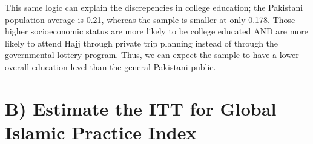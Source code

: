 \documentclass[
]{article}
\newenvironment{Shaded}{\begin{snugshade}}{\end{snugshade}}
\newcommand{\AttributeTok}[1]{\textcolor[rgb]{0.77,0.63,0.00}{#1}}
\newcommand{\CommentTok}[1]{\textcolor[rgb]{0.56,0.35,0.01}{\textit{#1}}}
\newcommand{\ControlFlowTok}[1]{\textcolor[rgb]{0.13,0.29,0.53}{\textbf{#1}}}
\newcommand{\DecValTok}[1]{\textcolor[rgb]{0.00,0.00,0.81}{#1}}
\newcommand{\FunctionTok}[1]{\textcolor[rgb]{0.00,0.00,0.00}{#1}}
\newcommand{\NormalTok}[1]{#1}
\newcommand{\OtherTok}[1]{\textcolor[rgb]{0.56,0.35,0.01}{#1}}
\newcommand{\SpecialCharTok}[1]{\textcolor[rgb]{0.00,0.00,0.00}{#1}}
\newcommand{\StringTok}[1]{\textcolor[rgb]{0.31,0.60,0.02}{#1}}
\begin{document}
This same logic can explain the discrepencies in college education; the
Pakistani population average is 0.21, whereas the sample is smaller at
only 0.178. Those higher socioeconomic status are more likely to be
college educated AND are more likely to attend Hajj through private trip
planning instead of through the governmental lottery program. Thus, we
can expect the sample to have a lower overall education level than the
general Pakistani public.

\hypertarget{b-estimate-the-itt-for-global-islamic-practice-index}{%
\section{B) Estimate the ITT for Global Islamic Practice
Index}\label{b-estimate-the-itt-for-global-islamic-practice-index}}

\begin{Shaded}
\end{Shaded}
\end{document}
